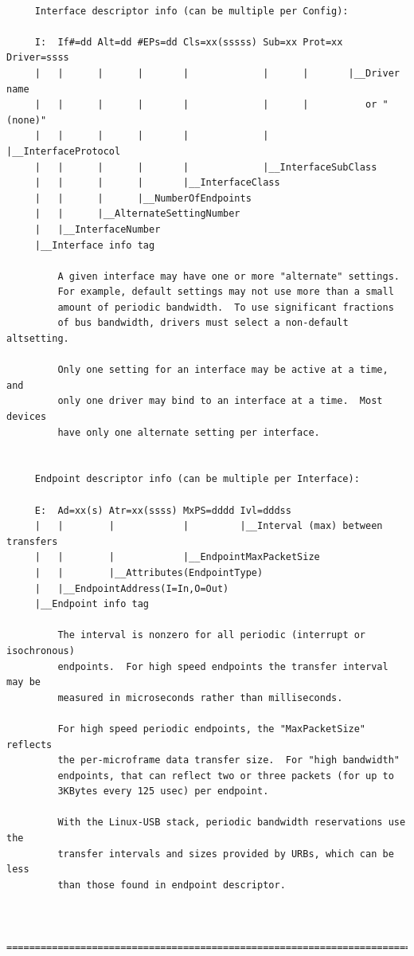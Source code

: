 {{{{{{{{{{{{{{{{{\begin{verbatim}
     
     Interface descriptor info (can be multiple per Config):
     
     I:  If#=dd Alt=dd #EPs=dd Cls=xx(sssss) Sub=xx Prot=xx Driver=ssss
     |   |      |      |       |             |      |       |__Driver name
     |   |      |      |       |             |      |          or "(none)"
     |   |      |      |       |             |      |__InterfaceProtocol
     |   |      |      |       |             |__InterfaceSubClass
     |   |      |      |       |__InterfaceClass
     |   |      |      |__NumberOfEndpoints
     |   |      |__AlternateSettingNumber
     |   |__InterfaceNumber
     |__Interface info tag
     
         A given interface may have one or more "alternate" settings.
         For example, default settings may not use more than a small
         amount of periodic bandwidth.  To use significant fractions
         of bus bandwidth, drivers must select a non-default altsetting.
     
         Only one setting for an interface may be active at a time, and
         only one driver may bind to an interface at a time.  Most devices
         have only one alternate setting per interface.
     
     
     Endpoint descriptor info (can be multiple per Interface):
     
     E:  Ad=xx(s) Atr=xx(ssss) MxPS=dddd Ivl=dddss
     |   |        |            |         |__Interval (max) between transfers
     |   |        |            |__EndpointMaxPacketSize
     |   |        |__Attributes(EndpointType)
     |   |__EndpointAddress(I=In,O=Out)
     |__Endpoint info tag
     
         The interval is nonzero for all periodic (interrupt or isochronous)
         endpoints.  For high speed endpoints the transfer interval may be
         measured in microseconds rather than milliseconds.
     
         For high speed periodic endpoints, the "MaxPacketSize" reflects
         the per-microframe data transfer size.  For "high bandwidth"
         endpoints, that can reflect two or three packets (for up to
         3KBytes every 125 usec) per endpoint.
     
         With the Linux-USB stack, periodic bandwidth reservations use the
         transfer intervals and sizes provided by URBs, which can be less
         than those found in endpoint descriptor.
     
     
     =======================================================================
     

\end{verbatim}}}}}}}}}}}}}}}}}}
